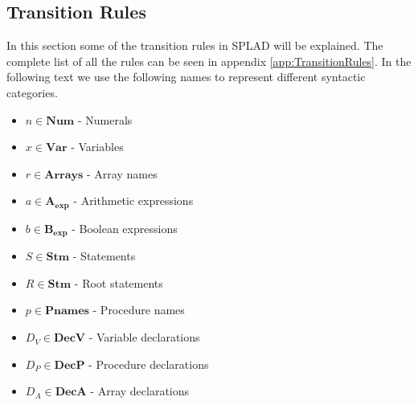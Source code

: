 \subsection{Transition Rules}
In this section some of the transition rules in SPLAD will be explained. The complete list of all the rules can be seen in appendix \ref{app:TransitionRules}.
In the following text we use the following names to represent different syntactic categories.
\begin{itemize}
\item $n \in \textbf{Num}$ - Numerals
\item $x \in \textbf{Var}$ - Variables 
\item $r \in \textbf{Arrays}$ - Array names
\item $a \in \mathbf{A_{exp}}$ - Arithmetic expressions
\item $b \in \mathbf{B_{exp}}$ - Boolean expressions
\item $S \in \textbf{Stm}$ - Statements
\item $R \in \textbf{Stm}$ - Root statements
\item $p \in \textbf{Pnames}$ - Procedure names
\item $D_V \in \textbf{DecV}$ - Variable declarations
\item $D_P \in \textbf{DecP}$ - Procedure declarations
\item $D_A \in \textbf{DecA}$ - Array declarations
\end{itemize}

